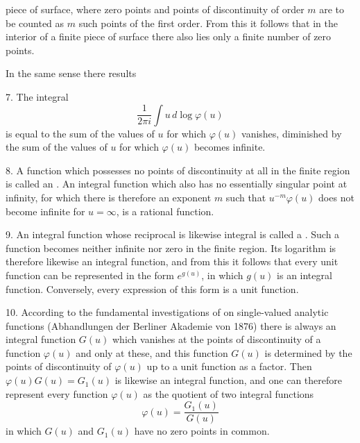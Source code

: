 
piece of surface, where zero points and points of discontinuity of order $m$ are to be counted as $m$ such points of the first order.
From this it follows that in the interior of a finite piece of surface there also lies only a finite number of zero points.

In the same sense there results

7. The integral
\[
\frac{1}{2\pi i}\int u\,d\log\varphi(u)
\]
is equal to the sum of the values of $u$ for which $\varphi(u)$ vanishes, diminished by the sum of the values of $u$ for which $\varphi(u)$ becomes infinite.

8. A function which possesses no points of discontinuity at all in the finite region is called an .  An integral function which also has no essentially singular point at infinity, for which there is therefore an exponent $m$ such that $u^{-m}\varphi(u)$ does not become infinite for $u = \infty$, is a rational function.

9. An integral function whose reciprocal is likewise integral is called a . Such a function becomes neither infinite nor zero in the finite region. Its logarithm is therefore likewise an integral function, and from this it follows that every unit function can be represented in the form $e^{g(u)}$, in which $g(u)$ is an integral function. Conversely, every expression of this form is a unit function.

10. According to the fundamental investigations of  on single-valued analytic functions (Abhandlungen der Berliner Akademie von 1876) there is always an integral function $G(u)$ which vanishes at the points of discontinuity of a function $\varphi(u)$ and only at these, and this function $G(u)$ is determined by the points of discontinuity of $\varphi(u)$ up to a unit function as a factor. Then $\varphi(u)G(u) = G_1(u)$ is likewise an integral function, and one can therefore represent every function $\varphi(u)$ as the quotient of two integral functions
\[
\varphi(u) = \frac{G_1(u)}{G(u)}
\]
in which $G(u)$ and $G_1(u)$ have no zero points in common.
